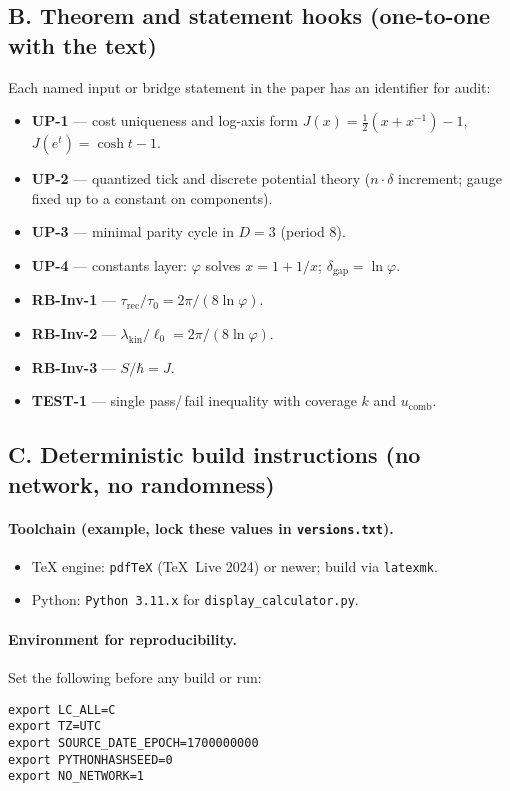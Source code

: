 \documentclass[11pt]{article}
\theoremstyle{plain}
\theoremstyle{definition}
\theoremstyle{remark}
\begin{document}
\subsection*{B. Theorem and statement hooks (one-to-one with the text)}
Each named input or bridge statement in the paper has an identifier for audit:
\begin{itemize}
  \item \textbf{UP-1} — cost uniqueness and log-axis form \(J(x)=\tfrac12(x+x^{-1})-1\), \(J(e^{t})=\cosh t-1\).
  \item \textbf{UP-2} — quantized tick and discrete potential theory (\(n\cdot\delta\) increment; gauge fixed up to a constant on components).
  \item \textbf{UP-3} — minimal parity cycle in \(D=3\) (period \(8\)).
  \item \textbf{UP-4} — constants layer: \(\varphi\) solves \(x=1+1/x\); \(\delta_{\mathrm{gap}}=\ln\varphi\).
  \item \textbf{RB-Inv-1} — \(\tau_{\mathrm{rec}}/\tau_{0}=2\pi/(8\ln\varphi)\).
  \item \textbf{RB-Inv-2} — \(\lambda_{\mathrm{kin}}/\ell_{0}=2\pi/(8\ln\varphi)\).
  \item \textbf{RB-Inv-3} — \(S/\hbar=J\).
  \item \textbf{TEST-1} — single pass/\,fail inequality with coverage \(k\) and \(u_{\mathrm{comb}}\).
\end{itemize}

\subsection*{C. Deterministic build instructions (no network, no randomness)}
\paragraph{Toolchain (example, lock these values in \texttt{versions.txt}).}
\begin{itemize}
  \item TeX engine: \texttt{pdfTeX} (TeX~Live 2024) or newer; build via \texttt{latexmk}.
  \item Python: \texttt{Python 3.11.x} for \texttt{display\_calculator.py}.
\end{itemize}

\paragraph{Environment for reproducibility.}
Set the following before any build or run:
\begin{verbatim}
export LC_ALL=C
export TZ=UTC
export SOURCE_DATE_EPOCH=1700000000
export PYTHONHASHSEED=0
export NO_NETWORK=1
\end{verbatim}
\end{document}
